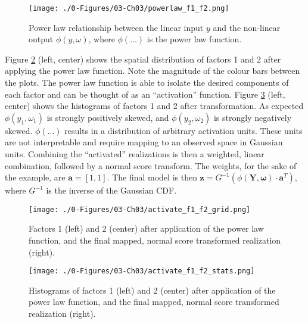 \begin{figure}[htb!]
    \centering
    \texttt{[image: ./0-Figures/03-Ch03/powerlaw\_f1\_f2.png]}
    \caption{Power law relationship between the linear input $y$ and the non-linear output $\phi(y, \omega)$, where $\phi(\dots)$ is the power law function. }
    \label{fig:powerlaw_f1_f2}
\end{figure}

Figure \ref{fig:activate_f1_f2_grid} (left, center) shows the spatial distribution of factors 1 and 2 after applying the power law function. Note the magnitude of the colour bars between the plots. The power law function is able to isolate the desired components of each factor and can be thought of as an ``activation'' function. Figure \ref{fig:activate_f1_f2_stats} (left, center) shows the histograms of factors 1 and 2 after transformation. As expected $\phi(y_{1}, \omega_{1})$ is strongly positively skewed, and $\phi(y_{2}, \omega_{2})$ is strongly negatively skewed. $\phi(\dots)$ results in a distribution of arbitrary activation units. These units are not interpretable and require mapping to an observed space in Gaussian units. Combining the ``activated'' realizations is then a weighted, linear combination, followed by a normal score transform. The weights, for the sake of the example, are $\mathbf{a} = [1,1]$. The final model is then $\mathbf{z} = G^{-1}(\phi(\mathbf{Y}, \boldsymbol{\omega}) \cdot \mathbf{a}^{T})$, where $G^{-1}$ is the inverse of the Gaussian \gls{CDF}.

\begin{figure}[htb!]
    \centering
    \texttt{[image: ./0-Figures/03-Ch03/activate\_f1\_f2\_grid.png]}
    \caption{Factors 1 (left) and 2 (center) after application of the power law function, and the final mapped, normal score transformed realization (right).}
    \label{fig:activate_f1_f2_grid}
\end{figure}

\begin{figure}[htb!]
    \centering
    \texttt{[image: ./0-Figures/03-Ch03/activate\_f1\_f2\_stats.png]}
    \caption{Histograms of factors 1 (left) and 2 (center) after application of the power law function, and the final mapped, normal score transformed realization (right).}
    \label{fig:activate_f1_f2_stats}
\end{figure}

